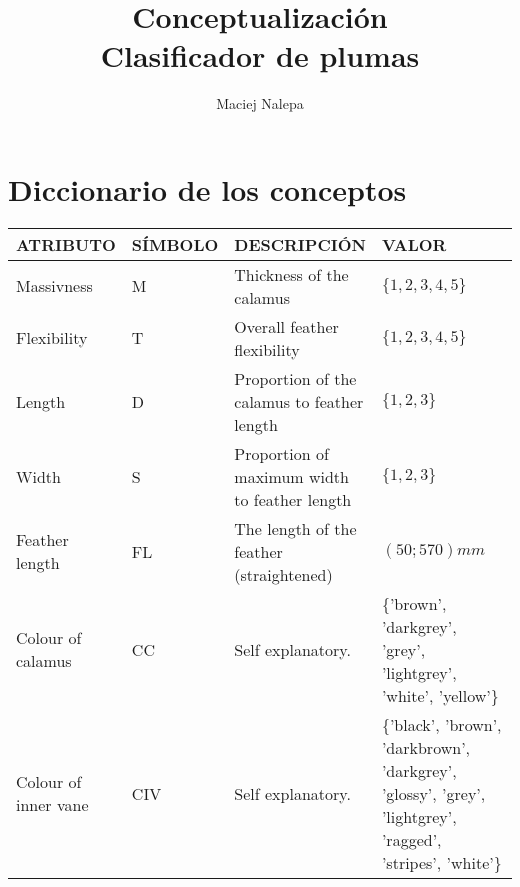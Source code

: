 \documentclass[a4paper,12pt]{article}
\title{Conceptualización\\ \normalsize{Clasificador de plumas}}
\author{Maciej Nalepa}
\begin{document}
\maketitle

\section{Diccionario de los conceptos}
\begin{table}[H]
	\centering
	\begin{tabular}{|p{0.2\linewidth}|p{0.15\linewidth}|p{0.25\linewidth}|p{0.4\linewidth}|}
		\hline
		ATRIBUTO                 & SÍMBOLO & DESCRIPCIÓN                                   & VALOR                                                                                                                                  \\ \hline\hline
		Massivness               & M       & Thickness of the calamus                      & $\{1,2,3,4,5\}$                                                                                                                        \\ \hline
		Flexibility              & T       & Overall feather flexibility                   & $\{1,2,3,4,5\}$                                                                                                                        \\ \hline
		Length                   & D       & Proportion of the calamus to feather length   & $\{1,2,3\}$                                                                                                                            \\ \hline
		Width                    & S       & Proportion of maximum width to feather length & $\{1,2,3\}$                                                                                                                            \\ \hline
		Feather length           & FL      & The length of the feather (straightened)      & $(50;570) mm$                                                                                                                          \\ \hline
		Colour of calamus        & CC      & Self explanatory.                             & \{'brown', 'darkgrey', 'grey', 'lightgrey', 'white', 'yellow'\}                                                                        \\ \hline
		Colour of inner vane     & CIV     & Self explanatory.                             & \{'black', 'brown', 'darkbrown', 'darkgrey', 'glossy', 'grey', 'lightgrey', 'ragged', 'stripes', 'white'\}                             \\ \hline

\end{tabular}
\end{table}
\end{document}
